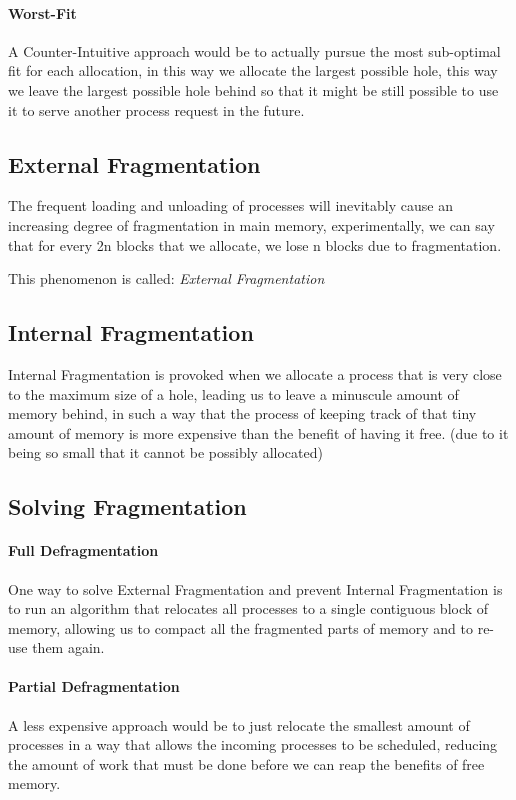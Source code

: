 \documentclass[openright, twoside]{report}
\theoremstyle{definition}
\theoremstyle{example}
\begin{document}
\paragraph{Worst-Fit}
	A Counter-Intuitive approach would be to actually pursue the most 
	sub-optimal fit for each allocation, in this way we allocate the largest
	possible hole, this way we leave the largest possible hole behind
	so that it might be still possible to use it to serve another 
	process request in the future.

\subsection{External Fragmentation}
	The frequent loading and unloading of processes will inevitably cause an 
	increasing degree of fragmentation in main memory, experimentally, we can say
	that for every 2n blocks that we allocate, we lose n blocks due to fragmentation.

	This phenomenon is called: \emph{External Fragmentation}

\subsection{Internal Fragmentation}
	Internal Fragmentation is provoked when we allocate a process that is very close 
	to the maximum size of a hole, leading us to leave a minuscule amount of memory 
	behind, in such a way that the process of keeping track of that tiny amount of memory 
	is more expensive than the benefit of having it free. (due to it being so small
	that it cannot be possibly allocated)

\subsection{Solving Fragmentation}

	\paragraph{Full Defragmentation}
	One way to solve External Fragmentation and prevent Internal Fragmentation is 
	to run an algorithm that relocates all processes to a single contiguous block 
	of memory, allowing us to compact all the fragmented parts of memory and to 
	re-use them again.
	
	\paragraph{Partial Defragmentation}
	A less expensive approach would be to just relocate the smallest amount of processes  
	in a way that allows the incoming processes to be scheduled, reducing the amount 
	of work that must be done before we can reap the benefits of free memory.
\end{document}
